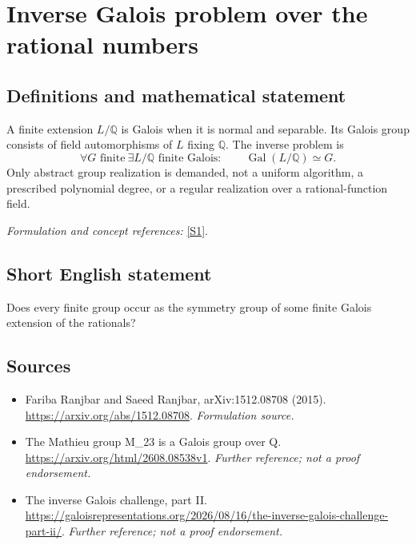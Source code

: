 \documentclass[11pt]{article}
\begin{document}
\section*{\texorpdfstring{Inverse Galois problem over the rational numbers}{Inverse Galois problem over the rational numbers}}\label{61}
\subsection{Definitions and mathematical statement}
A finite extension $L/{\mathbb{Q}}$ is Galois when it is normal and separable. Its Galois group consists of field automorphisms of $L$ fixing ${\mathbb{Q}}$. The inverse problem is
\[
 \forall G\text{ finite}\ \exists L/{\mathbb{Q}}\text{ finite Galois}:\qquad
 \operatorname{Gal}(L/{\mathbb{Q}})\simeq G.
\]
Only abstract group realization is demanded, not a uniform algorithm, a prescribed polynomial degree, or a regular realization over a rational-function field.
\par\smallskip\textit{Formulation and concept references:} \href{https://arxiv.org/abs/1512.08708}{[S1]}.

\subsection{Short English statement}
Does every finite group occur as the symmetry group of some finite Galois extension of the rationals?
\subsection{Sources}
\begin{itemize}
\item[S1]Fariba Ranjbar and Saeed Ranjbar, arXiv:1512.08708 (2015).
\url{https://arxiv.org/abs/1512.08708}.
\textit{Formulation source.}
\item[S2]The Mathieu group M\_23 is a Galois group over Q.
\url{https://arxiv.org/html/2608.08538v1}.
\textit{Further reference; not a proof endorsement.}
\item[S3]The inverse Galois challenge, part II.
\url{https://galoisrepresentations.org/2026/08/16/the-inverse-galois-challenge-part-ii/}.
\textit{Further reference; not a proof endorsement.}
\end{itemize}
\end{document}
